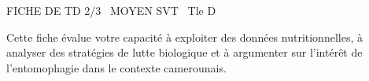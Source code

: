 \documentclass[11pt]{article}
\begin{document}
\begin{tcolorbox}[enhanced,colback=popink,colframe=popink,arc=10pt,boxrule=0pt,left=12pt,right=12pt,top=9pt,bottom=9pt]
{\color{white}\popxbold\small FICHE DE TD 2/3 \textbullet\ MOYEN \hfill SVT \textbullet\ Tle D\par}
\end{tcolorbox}
\vspace{4pt}
\noindent Cette fiche évalue votre capacité à exploiter des données nutritionnelles, à analyser des stratégies de lutte biologique et à argumenter sur l'intérêt de l'entomophagie dans le contexte camerounais.
\end{document}
